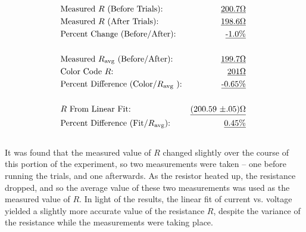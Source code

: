 \documentclass[twocolumn,english]{IEEEtran}
\theoremstyle{plain}
\theoremstyle{plain}
\begin{document}
  \begin{align*}
  &\text{Measured $R$ (Before Trials):} 			&\text{\underline{200.7$\Omega$} } 	\\
  &\text{Measured $R$ (After Trials):} 				&\text{\underline{198.6$\Omega$} }	\\
  &\text{Percent Change (Before/After):}			&\text{\underline{-1.0\%} }		\\ \\
  &\text{Measured $R_{\text{avg}}$ (Before/After):}		&\text{\underline{199.7$\Omega$} }	\\
  &\text{Color Code $R$:}					&\text{\underline{201$\Omega$} }	\\
  &\text{Percent Difference (Color/$R_{\text{avg}}$ ):}		&\text{\underline{-0.65\%} }		\\ \\
  &\text{$R$ From Linear Fit:}					&\text{\underline{(200.59 $\pm$.05)$\Omega$} }	\\
  &\text{Percent Difference (Fit/$R_{\text{avg}}$):}		&\text{\underline{0.45\%} }		\\ \\
  \end{align*}
  It was found that the measured value of $R$ changed slightly over the course of this portion of the experiment, so two measurements were taken -- one before running the trials, and one afterwards. As the resistor heated up, the resistance dropped, and so the average value of these two measurements was used as the measured value of $R$. In light of the results, the linear fit of current vs. voltage yielded a slightly more accurate value of the resistance $R$, despite the variance of the resistance while the measurements were taking place.

\noindent\hrulefill
\end{document}
